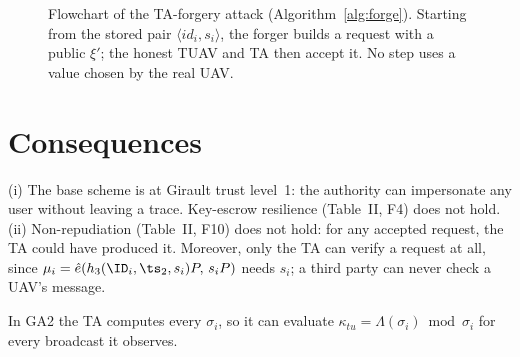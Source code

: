\begin{figure}[H]
\centering
{}
\caption{Flowchart of the TA-forgery attack (Algorithm~\ref{alg:forge}). Starting from the stored pair $\langle id_i,s_i\rangle$, the forger builds a request with a public $\xi'$; the honest TUAV and TA then accept it. No step uses a value chosen by the real UAV.}
\label{fig:f1flow}
\end{figure}

\section{Consequences}
\begin{corollary}\label{cor:escrow}
(i) The base scheme is at Girault trust level~1: the authority can impersonate any user without leaving a trace. Key-escrow resilience (Table~II,
F4) does not hold. (ii) Non-repudiation (Table~II, F10) does not hold: for any accepted request, the TA could have produced it. Moreover, only the TA
can verify a request at all, since $\mu_i=\hat e(h_3(\ID_i,\ts_2,s_i)P,\,s_iP)$ needs $s_i$; a third party can never check a UAV's message.
\end{corollary}

\begin{corollary}
In GA2 the TA computes every $\sigma_i$, so it can evaluate $\kappa_{tu}=\Lambda(\sigma_i)\bmod\sigma_i$ for every broadcast it observes.
\end{corollary}

